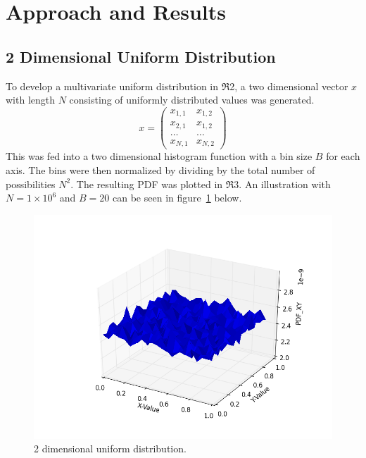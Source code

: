 \section{Approach and Results} 
\subsection{2 Dimensional Uniform Distribution} 
To develop a multivariate uniform distribution in $\Re$2, a two dimensional vector $x$ with length $N$ consisting of uniformly distributed values was generated.
\begin{equation}
x = \left( \begin{matrix}
				x_{1,1} & x_{1,2} \\ 
				x_{2,1} & x_{1,2} \\
				\dots & \dots \\ 
				x_{N,1} & x_{N,2}
			\end{matrix} \right)
\end{equation}  
This was fed into a two dimensional histogram function with a bin size $B$ for each axis. The bins were then normalized by dividing by the total number of possibilities $N^2$. The resulting PDF was plotted in $\Re3$. An illustration with $N = 1\times10^6$ and $B = 20$ can be seen in figure~\ref{fig: 2du} below.

\begin{figure}[H] 
	\centering 
	\includegraphics[width=\linewidth]{figure_1}
	\caption{2 dimensional uniform distribution.}
	\label{fig: 2du} 
\end{figure}

